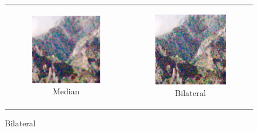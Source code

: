 \begin{figure}
\begin{tabular}{cc}
    \begin{subfigure}{0.3\textwidth}
      \includegraphics[width=\linewidth]{inc/research/complex/denoised_median.png}
      \caption{Median}
    \end{subfigure} &
    \begin{subfigure}{0.3\textwidth}
      \includegraphics[width=\linewidth]{inc/research/complex/denoised_bilateral.png}
      \caption{Bilateral}
    \end{subfigure} \\
    

\end{tabular}
\end{figure}
